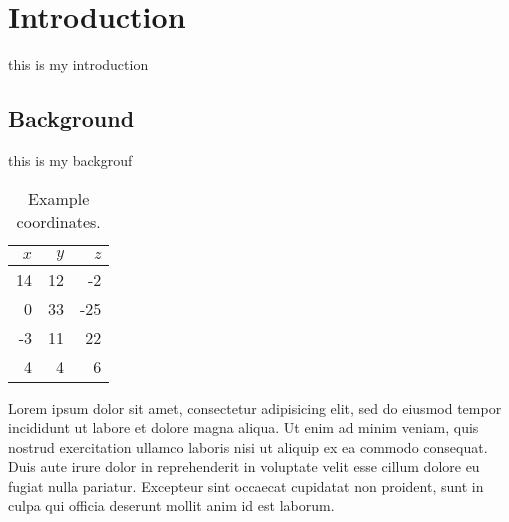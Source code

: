 \chapter{Introduction}

this is my introduction



\section{Background}

this is my backgrouf

\begin{table}
  \centering
  \begin{tabular}{|rr|r|}
    \hline
    $x$ & $y$ & $z$ \\
    \hline
    14 & 12 & -2 \\
    0 & 33 & -25 \\
    -3 & 11 & 22 \\
    4 & 4 & 6 \\
    \hline
  \end{tabular}
  \caption{Example coordinates.}
  \label{tab:coordinates}
\end{table}

Lorem ipsum dolor sit amet, consectetur adipisicing elit, sed do
eiusmod tempor incididunt ut labore et dolore magna aliqua. Ut enim ad
minim veniam, quis nostrud exercitation ullamco laboris nisi ut
aliquip ex ea commodo consequat. Duis aute irure dolor in
reprehenderit in voluptate velit esse cillum dolore eu fugiat nulla
pariatur. Excepteur sint occaecat cupidatat non proident, sunt in
culpa qui officia deserunt mollit anim id est laborum.


